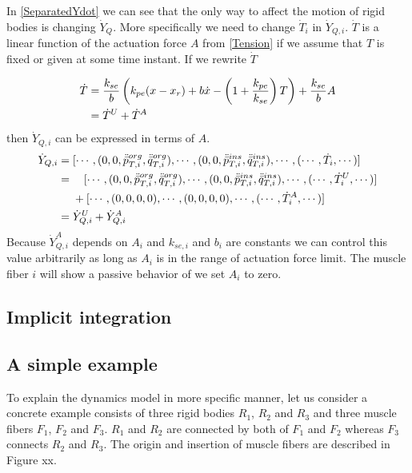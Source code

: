 \documentclass[a4paper,10pt]{article}
\begin{document}
In \eqref{SeparatedYdot} we can see that the only way to affect the motion
of rigid bodies is changing $\dot{Y}_Q$. More specifically we need to change
$\dot{T}_i$ in $\dot{Y}_{Q,i}$. $\dot{T}$ is a linear function of the actuation force $A$
from \eqref{Tension} if we assume that $T$ is fixed or given at some time instant.
If we rewrite $\dot{T}$

\begin{align}
\dot{T} = {} &   \frac{k_{se}}{b} \left( k_{pe}(x-x_{r})+b\dot{x}-\left(1+\frac{k_{pe}}{k_{se}}\right)T \right)
               + \frac{k_{se}}{b}A\notag\\
        = {} & \dot{T}^U + \dot{T}^A\label{TensionLinear}
\end{align}
then $\dot{Y}_{Q,i}$ can be expressed in terms of $A$.
\begin{align}
\dot{Y}_{Q,i} = {} & [ \cdots , (0, 0, \ddot{\bar{p}}_{T,i}^{org}, \ddot{\bar{q}}_{T,i}^{org}),
                       \cdots , (0, 0, \ddot{\bar{p}}_{T,i}^{ins}, \ddot{\bar{q}}_{T,i}^{ins}),
                       \cdots , (\cdots , \dot{T}_i, \cdots )]\notag\\
              = {} & \quad[ \cdots , (0, 0, \ddot{\bar{p}}_{T,i}^{org}, \ddot{\bar{q}}_{T,i}^{org}),
                       \cdots , (0, 0, \ddot{\bar{p}}_{T,i}^{ins}, \ddot{\bar{q}}_{T,i}^{ins}),
                       \cdots , (\cdots , \dot{T}_i^U, \cdots )]\notag\\
                   &+[ \cdots , (0, 0, 0, 0),
                       \cdots , (0, 0, 0, 0),
                       \cdots , (\cdots , \dot{T}_i^A, \cdots )]\notag\\
              = {} & \dot{Y}_{Q,i}^U + \dot{Y}_{Q,i}^A\label{ActuationForceRevealed}
\end{align}
Because $\dot{Y}_{Q,i}^A$ depends on $A_i$ and $k_{se,i}$ and $b_i$ are constants
we can control this value arbitrarily as long as $A_i$ is in the range of
actuation force limit.
The muscle fiber $i$ will show a passive behavior of we set $A_i$ to zero.

\subsection{Implicit integration}

\subsection{A simple example}

To explain the dynamics model in more specific manner, let us consider
a concrete example consists of three rigid bodies $R_1$, $R_2$ and $R_3$
and three muscle fibers $F_1$, $F_2$ and $F_3$. $R_1$ and $R_2$ are connected
by both of $F_1$ and $F_2$ whereas $F_3$ connects $R_2$ and $R_3$. The
origin and insertion of muscle fibers are described in Figure xx.
\end{document}
